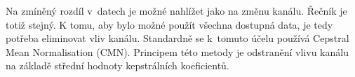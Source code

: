 
Na zmíněný rozdíl v~datech je možné nahlížet jako na změnu kanálu.
Řečník je totiž stejný.
K tomu, aby bylo možné použít všechna dostupná data, je tedy potřeba eliminovat vliv kanálu.
Standardně se k~tomuto účelu používá Cepstral Mean Normalisation (CMN). Principem této metody je odstranění vlivu kanálu na základě střední hodnoty kepstrálních koeficientů.







